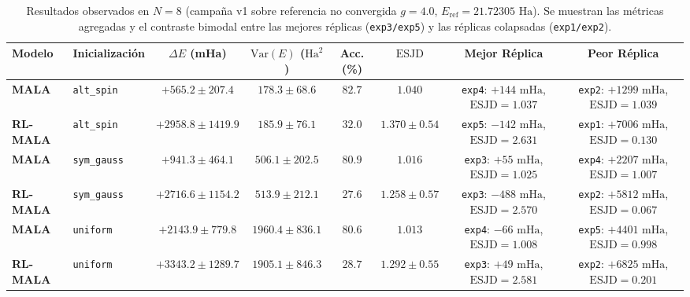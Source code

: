 \documentclass[10pt,a4paper]{article}
\begin{document}
\begin{table}[H]
\centering
\caption{Resultados observados en $N=8$ (campa\~na v1 sobre referencia no convergida $g=4.0$, $E_{\mathrm{ref}}=21.72305\text{ Ha}$). Se muestran las m\'etricas agregadas y el contraste bimodal entre las mejores r\'eplicas (\texttt{exp3/exp5}) y las r\'eplicas colapsadas (\texttt{exp1/exp2}).}
\begin{adjustbox}{max width=\textwidth}
\begin{tabular}{llcccccc}
\toprule
\textbf{Modelo} & \textbf{Inicializaci\'on} & \textbf{$\Delta E$ (mHa)} & \textbf{$\mathrm{Var}(E)$ ($\mathrm{Ha}^2$)} & \textbf{Acc. (\%)} & \textbf{$\mathrm{ESJD}$} & \textbf{Mejor R\'eplica} & \textbf{Peor R\'eplica} \\
\midrule
\textbf{MALA} & \texttt{alt\_spin} & $+565.2 \pm 207.4$ & $178.3 \pm 68.6$ & $82.7$ & $1.040$ & \texttt{exp4}: $+144\text{ mHa}$, $\mathrm{ESJD}=1.037$ & \texttt{exp2}: $+1299\text{ mHa}$, $\mathrm{ESJD}=1.039$ \\
\textbf{RL-MALA} & \texttt{alt\_spin} & $+2958.8 \pm 1419.9$ & $185.9 \pm 76.1$ & $32.0$ & $1.370 \pm 0.54$ & \texttt{exp5}: $-142\text{ mHa}$, $\mathrm{ESJD}=\mathbf{2.631}$ & \texttt{exp1}: $+7006\text{ mHa}$, $\mathrm{ESJD}=0.130$ \\
\midrule
\textbf{MALA} & \texttt{sym\_gauss} & $+941.3 \pm 464.1$ & $506.1 \pm 202.5$ & $80.9$ & $1.016$ & \texttt{exp3}: $+55\text{ mHa}$, $\mathrm{ESJD}=1.025$ & \texttt{exp4}: $+2207\text{ mHa}$, $\mathrm{ESJD}=1.007$ \\
\textbf{RL-MALA} & \texttt{sym\_gauss} & $+2716.6 \pm 1154.2$ & $513.9 \pm 212.1$ & $27.6$ & $1.258 \pm 0.57$ & \texttt{exp3}: $-488\text{ mHa}$, $\mathrm{ESJD}=\mathbf{2.570}$ & \texttt{exp2}: $+5812\text{ mHa}$, $\mathrm{ESJD}=0.067$ \\
\midrule
\textbf{MALA} & \texttt{uniform} & $+2143.9 \pm 779.8$ & $1960.4 \pm 836.1$ & $80.6$ & $1.013$ & \texttt{exp4}: $-66\text{ mHa}$, $\mathrm{ESJD}=1.008$ & \texttt{exp5}: $+4401\text{ mHa}$, $\mathrm{ESJD}=0.998$ \\
\textbf{RL-MALA} & \texttt{uniform} & $+3343.2 \pm 1289.7$ & $1905.1 \pm 846.3$ & $28.7$ & $1.292 \pm 0.55$ & \texttt{exp3}: $+49\text{ mHa}$, $\mathrm{ESJD}=\mathbf{2.581}$ & \texttt{exp2}: $+6825\text{ mHa}$, $\mathrm{ESJD}=0.201$ \\
\bottomrule
\end{tabular}
\end{adjustbox}
\end{table}
\end{document}
